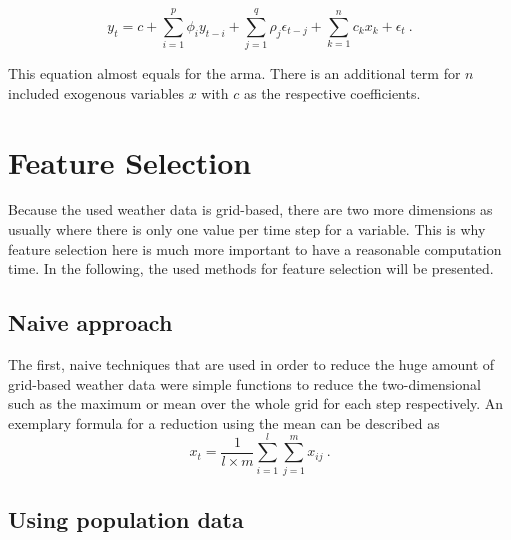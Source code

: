 \begin{equation}
y_t = c+\sum_{i=1}^{p}\phi_iy_{t-i}+\sum_{j=1}^{q}\rho_j\epsilon_{t-j}+\sum_{k=1}^{n}c_kx_k+\epsilon_t~.
\label{eq:armax}
\end{equation}

This equation almost equals  for the \gls{arma}. There is an additional term for $n$ included exogenous variables $x$ with $c$ as the respective coefficients.

%

\section{Feature Selection}
\label{sec:featsel}

Because the used weather data is grid-based, there are two more dimensions as usually where there is only one value per time step for a variable. This is why feature selection here is much more important to have a reasonable computation time. In the following, the used methods for feature selection will be presented.\\

\subsection{Naive approach}

The first, naive techniques that are used in order to reduce the huge amount of grid-based weather data were simple functions to reduce the two-dimensional such as the maximum or mean over the whole grid for each step respectively. An exemplary formula for a reduction using the mean can be described as\\

\begin{equation}
x_t = \frac{1}{l \times m} \sum_{i=1}^{l}\sum_{j=1}^{m}x_{ij}~.
\end{equation}

\subsection{Using population data}

